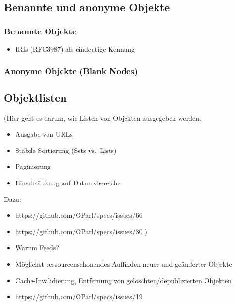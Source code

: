 \documentclass[,a4paper]{article}
\begin{document}
\subsection{Benannte und anonyme Objekte}

\subsubsection{Benannte Objekte}

\begin{itemize}
\item
  IRIs (RFC3987) als eindeutige Kennung
\end{itemize}

\subsubsection{Anonyme Objekte (Blank Nodes)}

\subsection{Objektlisten}

(Hier geht es darum, wie Listen von Objekten ausgegeben werden.

\begin{itemize}
\item
  Ausgabe von URLs
\item
  Stabile Sortierung (Sets vs.~Lists)
\item
  Paginierung
\item
  Einschränkung auf Datumsbereiche
\end{itemize}

Dazu:

\begin{itemize}
\item
  https://github.com/OParl/specs/issues/66
\item
  https://github.com/OParl/specs/issues/30 )
\end{itemize}


\begin{itemize}
\item
  Warum Feeds?
\item
  Möglichst ressourcenschonendes Auffinden neuer und geänderter Objekte
\item
  Cache-Invalidierung, Entfernung von gelöschten/depublizierten Objekten
\item
  https://github.com/OParl/specs/issues/19
\end{itemize}
\end{document}
